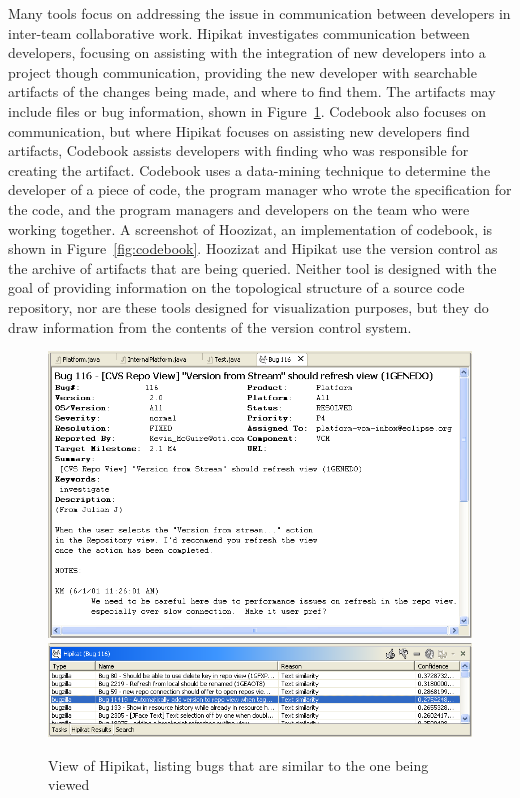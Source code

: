 Many tools focus on addressing the issue in communication between
developers in inter-team collaborative work. Hipikat\cite{Cubranic2005}
investigates communication between developers, focusing on assisting
with the integration of new developers into a project though
communication, providing the new developer with searchable artifacts of
the changes being made, and where to find them. The artifacts may
include files or bug information, shown in Figure~\ref{fig:hipikat}.
Codebook\cite{Begel2010} also focuses on communication, but where
Hipikat focuses on assisting new developers find artifacts, Codebook
assists developers with finding who was responsible for creating the
artifact. Codebook uses a data-mining technique to determine the
developer of a piece of code, the program manager who wrote the
specification for the code, and the program managers and developers on
the team who were working together. A screenshot of Hoozizat, an
implementation of codebook, is shown in Figure~\ref{fig:codebook}.
Hoozizat and Hipikat use the version control as the archive of artifacts
that are being queried. Neither tool is designed with the goal of
providing information on the topological structure of a source code
repository, nor are these tools designed for visualization purposes, but
they do draw information from the contents of the version control
system.

\begin{figure}[htpb]
  \centering
  \includegraphics[width=0.9\linewidth]{Figures/introduction/hipikat_bug.png}
  \includegraphics[width=0.9\linewidth]{Figures/introduction/hipikat.png}
  \caption{View of Hipikat, listing bugs that are similar to the one
  being viewed}
  \label{fig:hipikat}
\end{figure}

